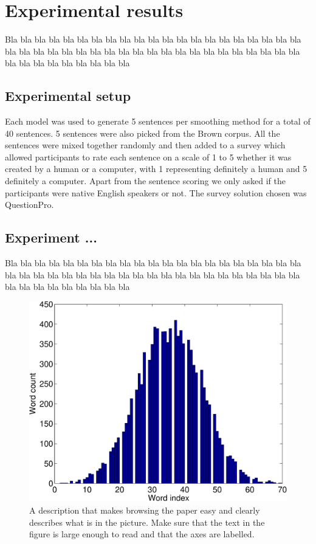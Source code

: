 \documentclass[a4paper,12pt]{article}
\begin{document}
  

\section{Experimental results}
\label{sec:exps}

Bla bla bla bla bla bla bla bla bla bla bla bla bla bla bla bla bla 
bla bla bla bla bla bla bla bla bla bla bla bla bla bla bla bla bla 
bla bla bla bla bla bla bla bla bla bla bla bla bla bla bla bla bla 

\subsection{Experimental setup}
Each model was used to generate 5 sentences per smoothing method for a total of 40 sentences. 5 sentences were also picked from the Brown corpus. All the sentences were mixed together randomly and then added to a survey which allowed participants to rate each sentence on a scale of 1 to 5 whether it was created by a human or a computer, with 1 representing definitely a human and 5 definitely a computer. Apart from the sentence scoring we only asked if the participants were native English speakers or not. The survey solution chosen was QuestionPro.

\subsection{Experiment ...}

Bla bla bla bla bla bla bla bla bla bla bla bla bla bla bla bla bla 
bla bla bla bla bla bla bla bla bla bla bla bla bla bla bla bla bla 
bla bla bla bla bla bla bla bla bla bla bla bla bla bla bla bla bla 

\begin{figure}
\centering
\includegraphics[width=0.8\linewidth]{histogram}
\caption{A description that makes browsing the paper easy and clearly 
describes what is in the picture. Make sure that the text in the figure 
is large enough to read and that the axes are labelled.}
\label{fig:histogram}
\end{figure}
\end{document}
